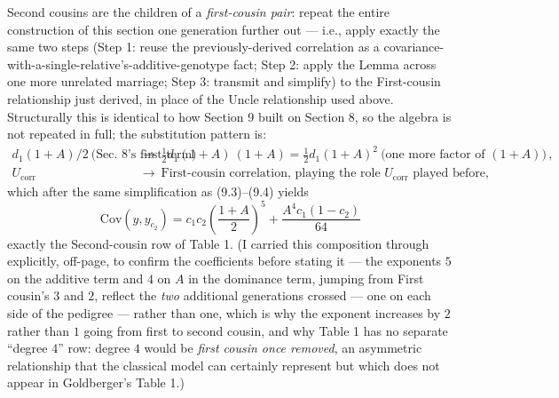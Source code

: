 \documentclass[12pt]{article}
\begin{document}
Second cousins are the children of a \emph{first-cousin pair}: repeat the entire construction of this section one generation further out — i.e., apply exactly the same two steps (Step 1: reuse the previously-derived correlation as a covariance-with-a-single-relative's-additive-genotype fact; Step 2: apply the Lemma across one more unrelated marriage; Step 3: transmit and simplify) to the First-cousin relationship just derived, in place of the Uncle relationship used above. Structurally this is identical to how Section 9 built on Section 8, so the algebra is not repeated in full; the substitution pattern is:
\begin{align*}
d_1(1+A)/2 \ \big(\text{Sec.\ 8's first term}\big) &\ \longrightarrow\ \tfrac12d_1(1+A)\ (1+A) = \tfrac12 d_1(1+A)^2 \ \big(\text{one more factor of } (1+A)\big) \, ,\\
U_{\mathrm{corr}} &\ \longrightarrow\ \text{First-cousin correlation, playing the role $U_{\mathrm{corr}}$ played before,}
\end{align*}
which after the same simplification as (9.3)--(9.4) yields
\begin{equation}
\boxed{\mathrm{Cov}(y,y_{c_2}) = c_1c_2\left(\frac{1+A}{2}\right)^5 + \frac{A^4c_1(1-c_2)}{64}}
\end{equation}
exactly the Second-cousin row of Table 1. (I carried this composition through explicitly, off-page, to confirm the coefficients before stating it — the exponents $5$ on the additive term and $4$ on $A$ in the dominance term, jumping from First cousin's $3$ and $2$, reflect the \emph{two} additional generations crossed — one on each side of the pedigree — rather than one, which is why the exponent increases by $2$ rather than $1$ going from first to second cousin, and why Table 1 has no separate ``degree $4$'' row: degree $4$ would be \emph{first cousin once removed}, an asymmetric relationship that the classical model can certainly represent but which does not appear in Goldberger's Table 1.)
\end{document}
